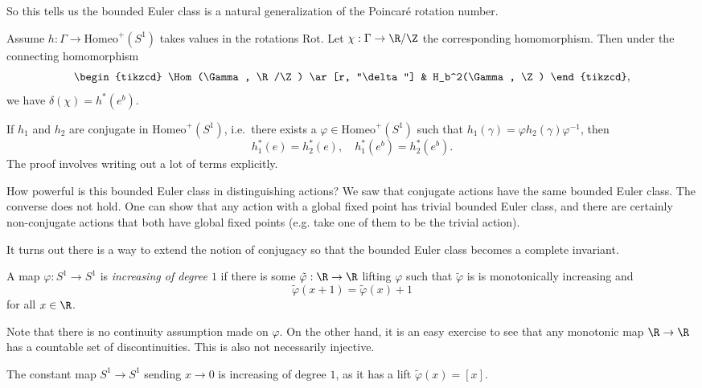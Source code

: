 \documentclass[a4paper]{article}
\newcommand\Homeo{\mathrm{Homeo}}
\newcommand\Rot{\mathrm{Rot}}
\begin{document}
So this tells us the bounded Euler class is a natural generalization of the Poincar\'e rotation number.

\begin{ex}
  Assume $h: \Gamma \to \Homeo^+(S^1)$ takes values in the rotations $\Rot$. Let $\chi: \Gamma \to \R/\Z$ the corresponding homomorphism. Then under the connecting homomorphism
  \[
    \begin{tikzcd}
      \Hom(\Gamma, \R/\Z) \ar[r, "\delta"] & H_b^2(\Gamma, \Z)
    \end{tikzcd},
  \]
  we have $\delta(\chi) = h^*(e^b)$.
\end{ex}

\begin{ex}
  If $h_1$ and $h_2$ are conjugate in $\Homeo^+(S^1)$, i.e.\ there exists a $\varphi \in \Homeo^+(S^1)$ such that $h_1(\gamma) = \varphi h_2(\gamma) \varphi^{-1}$, then
  \[
    h_1^*(e) = h_2^*(e),\quad h_1^*(e^b) = h_2^*(e^b).
  \]
  The proof involves writing out a lot of terms explicitly.
\end{ex}

How powerful is this bounded Euler class in distinguishing actions? We saw that conjugate actions have the same bounded Euler class. The converse does not hold. One can show that any action with a global fixed point has trivial bounded Euler class, and there are certainly non-conjugate actions that both have global fixed points (e.g. take one of them to be the trivial action).

It turns out there is a way to extend the notion of conjugacy so that the bounded Euler class becomes a complete invariant.

\begin{defi}
  A map $\varphi: S^1 \to S^1$ is \emph{increasing of degree $1$} if there is some $\tilde{\varphi}: \R \to \R$ lifting $\varphi$ such that $\tilde{\varphi}$ is is monotonically increasing and
  \[
    \tilde{\varphi}(x + 1) = \tilde{\varphi}(x) + 1
  \]
  for all $x \in \R$.
\end{defi}
Note that there is no continuity assumption made on $\varphi$. On the other hand, it is an easy exercise to see that any monotonic map $\R \to \R$ has a countable set of discontinuities. This is also not necessarily injective.

\begin{eg}
  The constant map $S^1 \to S^1$ sending $x \to 0$ is increasing of degree $1$, as it has a lift $\tilde{\varphi}(x) = [x]$.
\end{eg}
\end{document}
